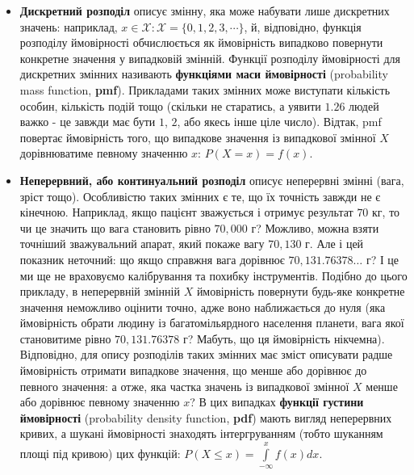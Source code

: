 \documentclass[
  11pt,
]{book}
\begin{document}
\begin{itemize}
\item
  \textbf{Дискретний розподіл} описує змінну, яка може набувати лише
  дискретних значень: наприклад,
  \(x \in \mathcal{X}: \mathcal{X} = \{0, 1, 2, 3, \cdots\}\), й,
  відповідно, функція розподілу ймовірності обчислюється як ймовірність
  випадково повернути конкретне значення у випадковій змінній. Функції
  розподілу ймовірності для дискретних змінних називають
  \textbf{функціями маси ймовірності} (probability mass function,
  \textbf{pmf}). Прикладами таких змінних може виступати кількість
  особин, кількість подій тощо (скільки не старатись, а уявити \(1.26\)
  людей важко - це завжди має бути \(1\), \(2\), або якесь інше ціле
  число). Відтак, pmf повертає ймовірність того, що випадкове значення
  із випадкової змінної \(X\) дорівнюватиме певному значенню \(x\):
  \(P(X = x) = f(x)\).
\item
  \textbf{Неперервний, або континуальний розподіл} описує неперервні
  змінні (вага, зріст тощо). Особливістю таких змінних є те, що їх
  точність завжди не є кінечною. Наприклад, якщо пацієнт зважується і
  отримує результат \(70\) кг, то чи це значить що вага становить рівно
  \(70,000\) г? Можливо, можна взяти точніший зважувальний апарат, який
  покаже вагу \(70,130\) г. Але і цей показник неточний: що якщо
  справжня вага дорівнює \(70,131.76378 \ldots\) г? І це ми ще не
  враховуємо калібрування та похибку інструментів. Подібно до цього
  прикладу, в неперервній змінній \(X\) ймовірність повернути будь-яке
  конкретне значення неможливо оцінити точно, адже воно наближається до
  нуля (яка ймовірність обрати людину із багатомільярдного населення
  планети, вага якої становитиме рівно \(70,131.76378\) г? Мабуть, що ця
  ймовірність нікчемна). Відповідно, для опису розподілів таких змінних
  має зміст описувати радше ймовірність отримати випадкове значення, що
  менше або дорівнює до певного значення: а отже, яка частка значень із
  випадкової змінної \(X\) менше або дорівнює певному значенню \(x\)? В
  цих випадках \textbf{функції густини ймовірності} (probability density
  function, \textbf{pdf}) мають вигляд неперервних кривих, а шукані
  ймовірності знаходять інтергруванням (тобто шуканням площі під кривою)
  цих функцій: \(P(X \leq x) = \int \limits_{-\infty}^x f(x) dx\).
\end{itemize}
\end{document}
